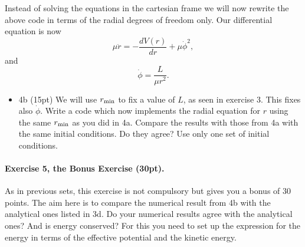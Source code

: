 \documentclass[%
oneside,                 %
final,                   %
10pt]{article}
\begin{document}
\noindent
Instead of solving the equations in the cartesian frame we will now rewrite the above code in terms of the radial degrees of freedom only. Our differential equation is now
\[
\mu \ddot{r}=-\frac{dV(r)}{dr}+\mu\dot{\phi}^2,
\]
and
\[
\dot{\phi}=\frac{L}{\mu r^2}.
\]

\begin{itemize}
\item 4b (15pt) We will use $r_{\rm min}$ to fix a value of $L$, as seen in exercise 3. This fixes also $\dot{\phi}$. Write a code which now implements the radial equation for $r$ using the same $r_{\rm min}$ as you did in 4a. Compare the results with those from 4a with the same initial conditions. Do they agree? Use only one set of initial conditions.
\end{itemize}

\noindent
\paragraph{Exercise 5, the Bonus Exercise (30pt).}
As in previous sets, this exercise is not compulsory but gives you a bonus of 30 points.
The aim here is to compare the numerical result from 4b with the analytical ones  listed in 3d. Do your numerical results agree with the analytical ones?  And is energy conserved?  For this you need to set up the expression for the energy in terms of the effective potential and the kinetic energy.

\end{document}
